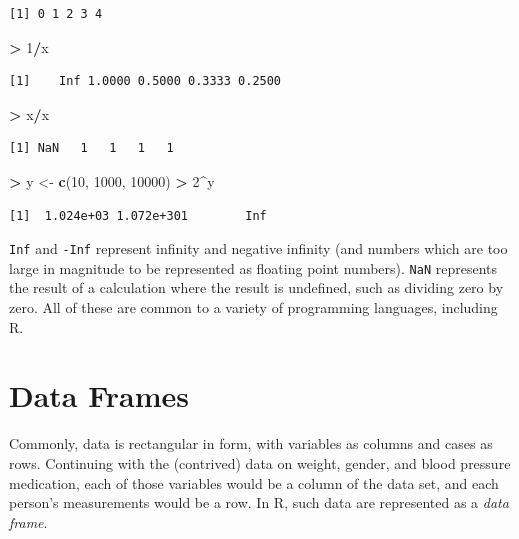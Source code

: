 \documentclass[]{krantz}
\makeatletter
\newenvironment{Shaded}{\begin{snugshade}}{\end{snugshade}}
\newcommand{\DecValTok}[1]{\textcolor[rgb]{0.06,0.06,0.06}{#1}}
\newcommand{\KeywordTok}[1]{\textcolor[rgb]{0.27,0.27,0.27}{\textbf{#1}}}
\newcommand{\NormalTok}[1]{#1}
\newcommand{\OperatorTok}[1]{\textcolor[rgb]{0.43,0.43,0.43}{\textbf{#1}}}
\newcommand{\StringTok}[1]{\textcolor[rgb]{0.5,0.5,0.5}{#1}}
\newenvironment{kframe}{%
\medskip{}
\setlength{\fboxsep}{.8em}
 \def\at@end@of@kframe{}%
 \ifinner\ifhmode%
  \def\at@end@of@kframe{\end{minipage}}%
  \begin{minipage}{\columnwidth}%
 \fi\fi%
 \def\FrameCommand##1{\hskip\@totalleftmargin \hskip-\fboxsep
 \colorbox{shadecolor}{##1}\hskip-\fboxsep
     \hskip-\linewidth \hskip-\@totalleftmargin \hskip\columnwidth}%
 \MakeFramed {\advance\hsize-\width
   \@totalleftmargin\z@ \linewidth\hsize
   \@setminipage}}%
 {\par\unskip\endMakeFramed%
 \at@end@of@kframe}
\renewenvironment{Shaded}{\begin{kframe}}{\end{kframe}}
\makeatother
\begin{document}
\begin{verbatim}
[1] 0 1 2 3 4
\end{verbatim}

\begin{Shaded}
\begin{Highlighting}[]
\OperatorTok{>}\StringTok{ }\DecValTok{1}\OperatorTok{/}\NormalTok{x}
\end{Highlighting}
\end{Shaded}

\begin{verbatim}
[1]    Inf 1.0000 0.5000 0.3333 0.2500
\end{verbatim}

\begin{Shaded}
\begin{Highlighting}[]
\OperatorTok{>}\StringTok{ }\NormalTok{x}\OperatorTok{/}\NormalTok{x}
\end{Highlighting}
\end{Shaded}

\begin{verbatim}
[1] NaN   1   1   1   1
\end{verbatim}

\begin{Shaded}
\begin{Highlighting}[]
\OperatorTok{>}\StringTok{ }\NormalTok{y <-}\StringTok{ }\KeywordTok{c}\NormalTok{(}\DecValTok{10}\NormalTok{, }\DecValTok{1000}\NormalTok{, }\DecValTok{10000}\NormalTok{)}
\OperatorTok{>}\StringTok{ }\DecValTok{2}\OperatorTok{^}\NormalTok{y}
\end{Highlighting}
\end{Shaded}

\begin{verbatim}
[1]  1.024e+03 1.072e+301        Inf
\end{verbatim}

\texttt{Inf} and \texttt{-Inf} represent infinity and negative infinity (and numbers which are too large in magnitude to be represented as floating point numbers). \texttt{NaN} represents the result of a calculation where the result is undefined, such as dividing zero by zero. All of these are common to a variety of programming languages, including R.

\hypertarget{dataFrames}{%
\section{Data Frames}\label{dataFrames}}

Commonly, data is rectangular in form, with variables as columns and cases as rows. Continuing with the (contrived) data on weight, gender, and blood pressure medication, each of those variables would be a column of the data set, and each person's measurements would be a row. In R, such data are represented as a \emph{data frame}.
\end{document}

